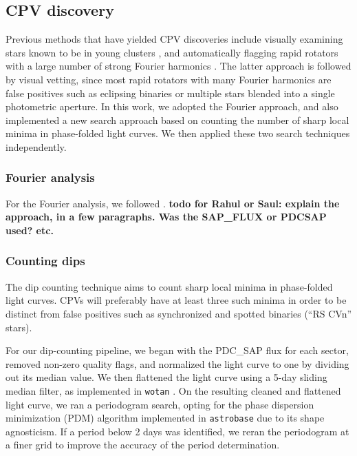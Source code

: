 \documentclass[11pt,twocolumn,tighten]{aastex63}
\begin{document}
\subsection{CPV discovery}
\label{subsec:discoverymethods}

Previous methods that have yielded CPV discoveries include visually
examining stars known to be in young clusters
\citep{2017AJ....153..152S}, and automatically flagging rapid rotators
with a large number of strong Fourier harmonics
\citep{2019ApJ...876..127Z}.  The latter approach is followed by
visual vetting, since most rapid rotators with many Fourier harmonics
are false positives such as eclipsing binaries or multiple stars
blended into a single photometric aperture.  In this work, we adopted
the Fourier approach,
and also implemented a new search approach based on counting the
number of sharp local minima in phase-folded light curves.  We then
applied these two search techniques independently.   


\subsubsection{Fourier analysis}
\label{subsec:fourier}
For the Fourier analysis, we followed
\citet{2019ApJ...876..127Z}.
{\bf todo for Rahul or Saul: explain the approach, in a few
paragraphs.  Was the SAP\_FLUX or PDCSAP used? etc. }


\subsubsection{Counting dips}
\label{subsec:counting}

The dip counting technique aims to count sharp local minima in
phase-folded light curves.  CPVs will preferably have at least three
such minima in order to be distinct from false positives such as
synchronized and spotted binaries (``RS CVn'' stars). 

For our dip-counting pipeline, we began with the PDC\_SAP flux for
each sector, removed non-zero quality flags, and normalized the light
curve to one by dividing out its median value.  We then flattened the
light curve using a 5-day sliding median filter, as implemented in
\texttt{wotan} \citep{2019AJ....158..143H}.  On the resulting
cleaned and flattened light curve, we ran a periodogram search, opting
for the \citet{1978ApJ...224..953S} phase dispersion minimization
(PDM)
algorithm implemented in \texttt{astrobase}
\citep{2021zndo...1011188B} due to its shape agnosticism.  If a period
below 2 days was identified, we reran the periodogram at a
finer grid to improve the accuracy of the period determination.
\end{document}
